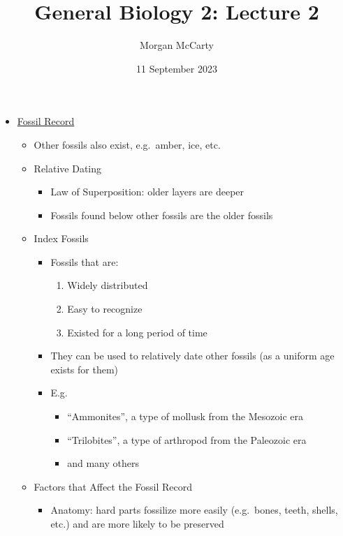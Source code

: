 \documentclass[12pt]{article}
\title{
    General Biology 2: Lecture 2}
\author{Morgan McCarty}
\date{11 September 2023}
\begin{document}
    \maketitle

    \begin{itemize}
        \item \underline{Fossil Record}
        \begin{itemize}
            \item Other fossils also exist, e.g.\ amber, ice, etc.
            \item Relative Dating
            \begin{itemize}
                \item Law of Superposition: older layers are deeper
                \item Fossils found below other fossils are the older fossils
            \end{itemize}
            \item Index Fossils
            \begin{itemize}
                \item Fossils that are:
                \begin{enumerate}
                    \item Widely distributed
                    \item Easy to recognize
                    \item Existed for a long period of time
                \end{enumerate}
                \item They can be used to relatively date other fossils (as a uniform age exists for them)
                \item E.g.
                \begin{itemize}
                    \item ``Ammonites'', a type of mollusk from the Mesozoic era
                    \item ``Trilobites'', a type of arthropod from the Paleozoic era
                    \item and many others
                \end{itemize}
            \end{itemize}
            \item Factors that Affect the Fossil Record
            \begin{itemize}
                \item Anatomy: hard parts fossilize more easily (e.g.\ bones, teeth, shells, etc.) and are more likely to be preserved

\end{itemize}
\end{itemize}
\end{itemize}
\end{document}
